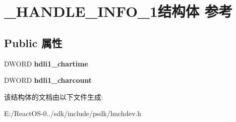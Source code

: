 \hypertarget{struct___h_a_n_d_l_e___i_n_f_o__1}{}\section{\+\_\+\+H\+A\+N\+D\+L\+E\+\_\+\+I\+N\+F\+O\+\_\+1结构体 参考}
\label{struct___h_a_n_d_l_e___i_n_f_o__1}
\subsection*{Public 属性}
\begin{DoxyCompactItemize}
\item 
\mbox{\label{struct___h_a_n_d_l_e___i_n_f_o__1_ac8feefe91b0e8ee020050367fcb2d9ee}} 
D\+W\+O\+RD {\bfseries hdli1\+\_\+chartime}
\item 
\mbox{\label{struct___h_a_n_d_l_e___i_n_f_o__1_aaf8393f3cef2fc20a32bd5b59d163c50}} 
D\+W\+O\+RD {\bfseries hdli1\+\_\+charcount}
\end{DoxyCompactItemize}


该结构体的文档由以下文件生成\+:\begin{DoxyCompactItemize}
\item 
E\+:/\+React\+O\+S-\/0../sdk/include/psdk/lmchdev.\+h\end{DoxyCompactItemize}
